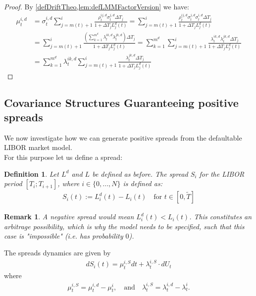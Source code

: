 \documentclass[12pt]{article}
\newtheorem{remark}[theorem]{Remark}
\newtheorem{definition}[theorem]{Definition}
\begin{document}
	\begin{proof}
		By \cref{defDriftTheo,lem:defLMMFactorVersion} we have:
		\begin{align*}
			\mu^{i, d}_t &= \sigma^{i, d}_t\sum_{j=m(t)+1}^{i}\frac{\rho^{i j, d}_t \sigma^{j, d}_t\Delta T_j}{1 + \Delta T_j L^d_j(t)} = \sum_{j=m(t)+1}^{i}\frac{\rho^{i j, d}_t \sigma^{j, d}_t \sigma^{i, d}_t\Delta T_j}{1 + \Delta T_j L^d_j(t)}\\
			&= \sum_{j=m(t)+1}^{i}\frac{\left(\sum_{k=1}^{m^d}\lambda^{i k,d}_t\lambda^{j k,d}_t\right)\Delta T_j}{1 + \Delta T_j L^d_j(t)}
			=\sum_{k=1}^{m^d}\sum_{j=m(t)+1}^{i}\frac{\lambda^{i k,d}_t\lambda^{j k,d}_t\Delta T_j}{1 + \Delta T_j L^d_j(t)}\\
			&= \sum_{k=1}^{m^d}\lambda^{i k,d}_t\sum_{j=m(t)+1}^{i}\frac{\lambda^{j k,d}_t\Delta T_j}{1 + \Delta T_j L^d_j(t)}
		\end{align*}
	\end{proof}
	
	
	\subsection{Covariance Structures Guaranteeing positive spreads}
	We now investigate how we can generate positive spreads from the defaultable LIBOR market model.\\
	For this purpose let us define a spread:
	\begin{definition}
		Let $L^d$ and $L$ be defined as before.
		The \emph{spread} $S_i$ for the LIBOR period $[T_i; T_{i+1}]$, where $i \in \{0, ..., N\}$ is defined as:
		\begin{align*}
			S_i(t) := L^d_i(t) - L_i(t) \quad \text{for } t \in \left[0,\tilde{T}\right]
		\end{align*}
	\end{definition}
	\begin{remark}
		A negative spread would mean $L^d_i(t) < L_i(t)$. This constitutes an arbitrage possibility, %
		which is why the model needs to be specified, such that this case is "impossible" (i.e. has probability $0$).
	\end{remark}
	The spreads dynamics are given by
	\begin{align*}
		dS_i(t) = \mu^{i,S}_t dt + \lambda^{i,S}_t \cdot dU_t
	\end{align*}
	where 
	\begin{align*}
		\mu^{i,S}_t = \mu^{i,d}_t - \mu^{i}_t, \quad \text{and} 
		\quad \lambda^{i,S}_t = \lambda^{i,d}_t - \lambda^{i}_t.
	\end{align*}
	
\end{document}
